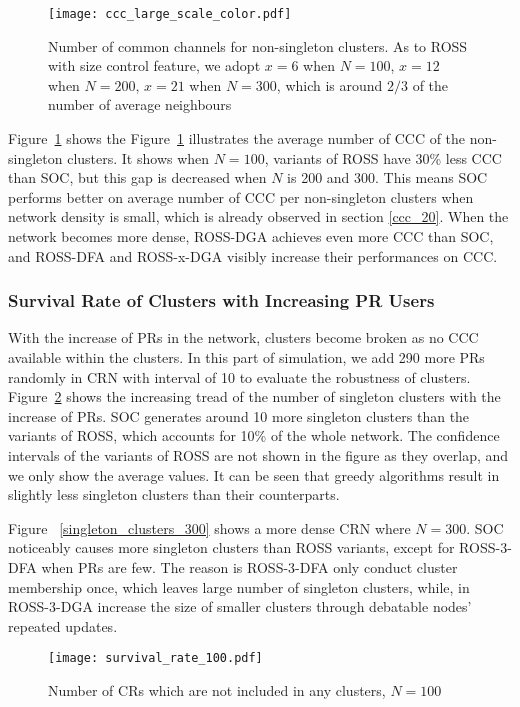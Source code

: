 \begin{figure}[ht!]
  \centering
  \texttt{[image: ccc\_large\_scale\_color.pdf]}
  \caption{Number of common channels for non-singleton clusters. As to ROSS with size control feature, we adopt $x=6$ when $N=100$, $x=12$ when $N=200$, $x=21$ when $N=300$, which is around $2/3$ of the number of average neighbours}
  \label{ccc_large_scale}
\end{figure}
Figure~\ref{ccc_large_scale} shows the 
Figure~\ref{ccc_large_scale} illustrates the average number of CCC of the non-singleton clusters.
It shows when $N=100$, variants of ROSS have 30\% less CCC than SOC, but this gap is decreased when $N$ is 200 and 300.
This means SOC performs better on average number of CCC per non-singleton clusters when network density is small, which is already observed in section \ref{ccc_20}.
When the network becomes more dense, ROSS-DGA achieves even more CCC than SOC, and ROSS-DFA and ROSS-x-DGA visibly increase their performances on CCC.



\subsubsection*{Survival Rate of Clusters with Increasing PR Users}
With the increase of PRs in the network, clusters become broken as no CCC available within the clusters.
In this part of simulation, we add 290 more PRs randomly in CRN with interval of 10 to evaluate the robustness of clusters.
Figure~\ref{singleton_clusters_100} shows the increasing tread of the number of singleton clusters with the increase of PRs.
SOC generates around 10 more singleton clusters than the variants of ROSS, which accounts for 10\% of the whole network.
The confidence intervals of the variants of ROSS are not shown in the figure as they overlap, and we only show the average values.
It can be seen that greedy algorithms result in slightly less singleton clusters than their counterparts.

Figure ~\ref{singleton_clusters_300} shows a more dense CRN where $N=300$.
SOC noticeably causes more singleton clusters than ROSS variants, except for ROSS-3-DFA when PRs are few.
The reason is ROSS-3-DFA only conduct cluster membership once, which leaves large number of singleton clusters, while, in ROSS-3-DGA increase the size of smaller clusters through debatable nodes' repeated updates.

\begin{figure}[h!]
  \centering
  \texttt{[image: survival\_rate\_100.pdf]}
  \caption{Number of CRs which are not included in any clusters, $N=100$}
  \label{singleton_clusters_100}
\end{figure}

